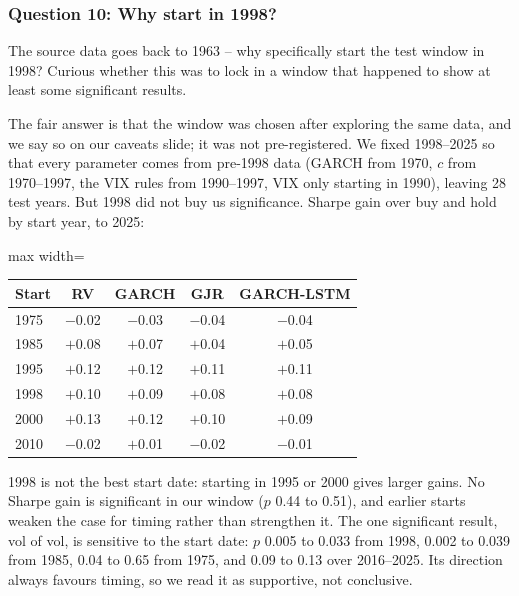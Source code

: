\subsubsection*{Question 10: Why start in 1998?}
\begin{question}
The source data goes back to 1963 -- why specifically start the test window in 1998? Curious whether this was to lock in a window that happened to show at least some significant results.
\end{question}
The fair answer is that the window was chosen after exploring the same data, and we say so on our caveats slide; it was not pre-registered. We fixed 1998--2025 so that every parameter comes from pre-1998 data (GARCH from 1970, $c$ from 1970--1997, the VIX rules from 1990--1997, VIX only starting in 1990), leaving 28 test years. But 1998 did not buy us significance. Sharpe gain over buy and hold by start year, to 2025:
\begin{center}\small
\begin{adjustbox}{max width=\linewidth}\begin{tabular}{@{}lcccc@{}}
\toprule
Start & RV & GARCH & GJR & GARCH-LSTM\\
\midrule
1975 & $-$0.02 & $-$0.03 & $-$0.04 & $-$0.04\\
1985 & $+$0.08 & $+$0.07 & $+$0.04 & $+$0.05\\
1995 & $+$0.12 & $+$0.12 & $+$0.11 & $+$0.11\\
1998 & $+$0.10 & $+$0.09 & $+$0.08 & $+$0.08\\
2000 & $+$0.13 & $+$0.12 & $+$0.10 & $+$0.09\\
2010 & $-$0.02 & $+$0.01 & $-$0.02 & $-$0.01\\
\bottomrule
\end{tabular}\end{adjustbox}
\end{center}
1998 is not the best start date: starting in 1995 or 2000 gives larger gains. No Sharpe gain is significant in our window ($p$ 0.44 to 0.51), and earlier starts weaken the case for timing rather than strengthen it. The one significant result, vol of vol, is sensitive to the start date: $p$ 0.005 to 0.033 from 1998, 0.002 to 0.039 from 1985, 0.04 to 0.65 from 1975, and 0.09 to 0.13 over 2016--2025. Its direction always favours timing, so we read it as supportive, not conclusive.

